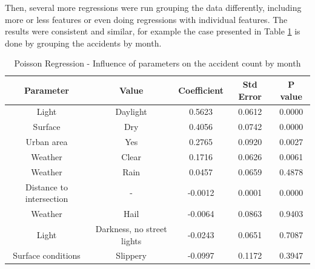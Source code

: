 Then, several more regressions were run grouping the data differently, including more or less features or even doing regressions with individual features. The results were consistent and similar, for example the case presented in Table \ref{tab:regression2} is done by grouping the accidents by month. %
\\
\begin{table}[h]
\centering
\begin{tabular}{|c|c|c|c|c|}
\hline
\textbf{Parameter}       & \textbf{Value}             & \textbf{Coefficient} & \textbf{Std Error} & \textbf{P value} \\ \hline
Light                    & Daylight                   & 0.5623               & 0.0612             & 0.0000           \\ \hline
Surface                  & Dry                        & 0.4056               & 0.0742             & 0.0000           \\ \hline
Urban area               & Yes                        & 0.2765               & 0.0920             & 0.0027           \\ \hline
Weather                  & Clear                      & 0.1716               & 0.0626             & 0.0061           \\ \hline
Weather                  & Rain                       & 0.0457               & 0.0659             & 0.4878           \\ \hline
Distance to intersection & -                          & -0.0012              & 0.0001             & 0.0000           \\ \hline
Weather                  & Hail                       & -0.0064              & 0.0863             & 0.9403           \\ \hline
Light                    & Darkness, no street lights & -0.0243              & 0.0651             & 0.7087           \\ \hline
Surface conditions       & Slippery                   & -0.0997              & 0.1172             & 0.3947           \\ \hline
\end{tabular}
\captionsetup{justification=centering}
\caption{Poisson Regression - Influence of parameters on the accident count by month}
\label{tab:regression2}
\end{table}

